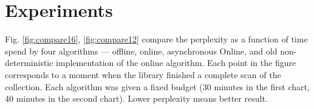 \documentclass[russian,english]{llncs}
\newcounter{wavenum}
\newcommand*{\clki}{
  \draw (t_cur) -- ++(0,.0) -- ++(.5,0) -- ++(0,-.0) -- ++(.5,0) -- ++(0,.0)
    node[time] (t_cur) {};
}
\newcommand*{\bitvector}[6]{
  \fill[fill=#3, pattern=#5, pattern color=#4,fill opacity=#6]
                         (t_cur) -- ++( .0, .2) -- ++(#2-.0,0) -- ++(.0, -.18)
                         -- ++(-.0,-.18) -- ++(.0-#2,0) -- cycle;
  \path (t_cur) -- node[anchor=mid] {#1} ++(#2,0) node[time] (t_cur) {};
}
\newcommand*{\Wait}[2]{
    \bitvector{#1}{#2}{white}{white}{}{0.0}
}
\newcommand*{\ProcBatchOne}[2][XXX]{
    \bitvector{#1}{#2}{orange}{orange}{}{1.0}
}
\newcommand*{\ProcBatchTwo}[2][XXX]{
    \bitvector{#1}{#2}{yellow}{yellow}{}{1.0}
}
\newcommand{\nextwave}[1]{
  \path (0,\value{wavenum} * 0.5) node[left] {#1} node[time] (t_cur) {};
  \addtocounter{wavenum}{-1}
}
\newenvironment{wave}[3][\bf{time}]{
  \begin{tikzpicture}[draw=black, yscale=1.5,xscale=1.0]
    \tikzstyle{time}=[coordinate]
    \setlength{\unitlength}{1cm}
    \def\wavewidth{#3}
    \setcounter{wavenum}{0}
    \nextwave{#1}

    \draw[dotted] (t_cur) +(0,.1) node[above] {t=0\%} -- ++(0,2.8-#2);
    \clki
    \foreach \t in {1,...,\wavewidth}{
      \draw[dotted] (t_cur) +(0,.1) node[above] {\t0\%} -- ++(0,2.8-#2);
      \clki
    }
}{\end{tikzpicture}}
\begin{document}

\section{Experiments}
\label{sec:Experiments}

Fig. \ref{fig:compare16}, \ref{fig:compare12} compare the perplexity as a function of time spend by four algorithms ---
offline,
online,
asynchronous Online,
and old non-deterministic implementation of the online algorithm.
Each point in the figure corresponds to a moment when the library finished a complete scan of the collection.
Each algorithm was given a fixed budget (30 minutes in the first chart, 40 minutes in the second chart).
Lower perplexity means better result.
\end{document}
